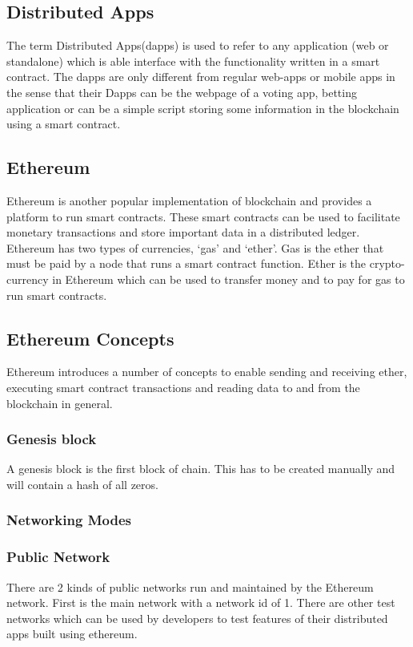 \documentclass[11pt,openright]{report}
\begin{document}
\subsection{Distributed Apps}
The term Distributed Apps(dapps) is used to refer to any application (web or standalone) which is able interface with the functionality written in a smart contract. The dapps are only different from regular web-apps or mobile apps in the sense that their Dapps can be the webpage of a voting app, betting application or can be a simple script storing some information in the blockchain using a smart contract.

\subsection{Ethereum}
Ethereum is another popular implementation of blockchain and provides a platform to run smart contracts. These smart contracts can be used to facilitate monetary transactions and store important data in a distributed ledger. Ethereum has two types of currencies, ‘gas’ and ‘ether’. Gas is the ether that must be paid by a node that runs a smart contract function. Ether is the crypto-currency in Ethereum which can be used to transfer money and to pay for gas to run smart contracts.

\subsection{Ethereum Concepts}
Ethereum introduces a number of concepts to enable sending and receiving ether, executing smart contract transactions and reading data to and from the blockchain in general.

\subsubsection{Genesis block}
A genesis block is the first block of chain. This has to be created manually and will contain a hash of all zeros.

\subsubsection{Networking Modes}
\subsubsection{Public Network}
There are 2 kinds of public networks run and maintained by the Ethereum network. 
First is the main network with a network id of 1. There are other test networks which can be used by developers to test features of their distributed apps built using ethereum.
\end{document}
